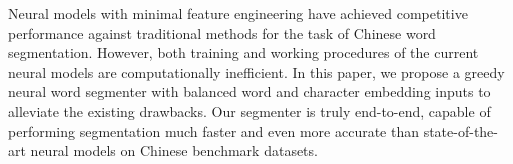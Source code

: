 Neural models with minimal feature engineering have achieved competitive performance against traditional methods for the task of Chinese word segmentation. However, both training and working procedures of the current neural models are computationally inefficient. In this paper, we propose a greedy neural word segmenter with balanced word and character embedding inputs to alleviate the existing drawbacks. Our segmenter is truly end-to-end, capable of performing segmentation much faster and even more accurate than state-of-the-art neural models on Chinese benchmark datasets.
